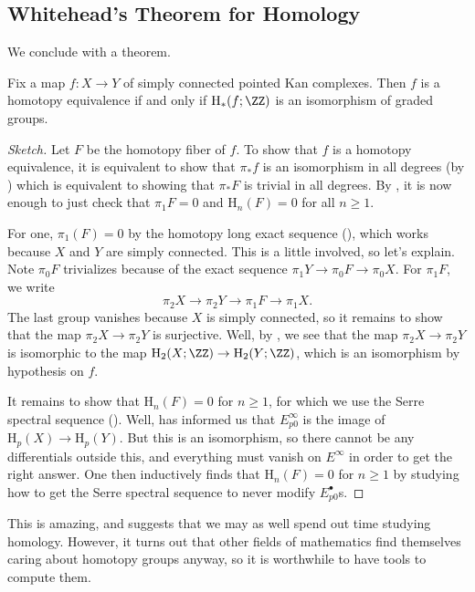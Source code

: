 \documentclass[../notes.tex]{subfiles}
\begin{document}
\subsection{Whitehead's Theorem for Homology}
We conclude with a theorem.
\begin{theorem}
	Fix a map $f\colon X\to Y$ of simply connected pointed Kan complexes. Then $f$ is a homotopy equivalence if and only if $\mathrm H_*(f;\ZZ)$ is an isomorphism of graded groups.
\end{theorem}
\begin{proof}[Sketch]
	Let $F$ be the homotopy fiber of $f$. To show that $f$ is a homotopy equivalence, it is equivalent to show that $\pi_*f$ is an isomorphism in all degrees (by ) which is equivalent to showing that $\pi_*F$ is trivial in all degrees. By , it is now enough to just check that $\pi_1F=0$ and $\mathrm H_n(F)=0$ for all $n\ge1$.
	
	For one, $\pi_1(F)=0$ by the homotopy long exact sequence (), which works because $X$ and $Y$ are simply connected. This is a little involved, so let's explain. Note $\pi_0F$ trivializes because of the exact sequence $\pi_1Y\to\pi_0F\to\pi_0X$. For $\pi_1F$, we write
	\[\pi_2X\to\pi_2Y\to\pi_1F\to\pi_1X.\]
	The last group vanishes because $X$ is simply connected, so it remains to show that the map $\pi_2X\to\pi_2Y$ is surjective. Well, by , we see that the map $\pi_2X\to\pi_2Y$ is isomorphic to the map $\mathrm H_2(X;\ZZ)\to\mathrm H_2(Y;\ZZ)$, which is an isomorphism by hypothesis on $f$.

	It remains to show that $\mathrm H_n(F)=0$ for $n\ge1$, for which we use the Serre spectral sequence (). Well,  has informed us that $E^\infty_{p0}$ is the image of $\mathrm H_p(X)\to\mathrm H_p(Y)$. But this is an isomorphism, so there cannot be any differentials outside this, and everything must vanish on $E^\infty$ in order to get the right answer. One then inductively finds that $\mathrm H_n(F)=0$ for $n\ge1$ by studying how to get the Serre spectral sequence to never modify $E^\bullet_{p0}$s.
\end{proof}
\begin{remark}
	This is amazing, and suggests that we may as well spend out time studying homology. However, it turns out that other fields of mathematics find themselves caring about homotopy groups anyway, so it is worthwhile to have tools to compute them.
\end{remark}
\end{document}
